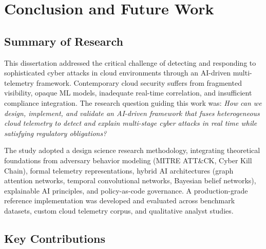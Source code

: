 \chapter{Conclusion and Future Work}\label{chap:conclusion}

\section{Summary of Research}\label{sec:conclusion-summary}
This dissertation addressed the critical challenge of detecting and responding to sophisticated cyber attacks in cloud environments through an AI-driven multi-telemetry framework. Contemporary cloud security suffers from fragmented visibility, opaque ML models, inadequate real-time correlation, and insufficient compliance integration. The research question guiding this work was: \emph{How can we design, implement, and validate an AI-driven framework that fuses heterogeneous cloud telemetry to detect and explain multi-stage cyber attacks in real time while satisfying regulatory obligations?}

The study adopted a design science research methodology, integrating theoretical foundations from adversary behavior modeling (MITRE ATT\&CK, Cyber Kill Chain), formal telemetry representations, hybrid AI architectures (graph attention networks, temporal convolutional networks, Bayesian belief networks), explainable AI principles, and policy-as-code governance. A production-grade reference implementation was developed and evaluated across benchmark datasets, custom cloud telemetry corpus, and qualitative analyst studies.

\section{Key Contributions}\label{sec:conclusion-contributions}
